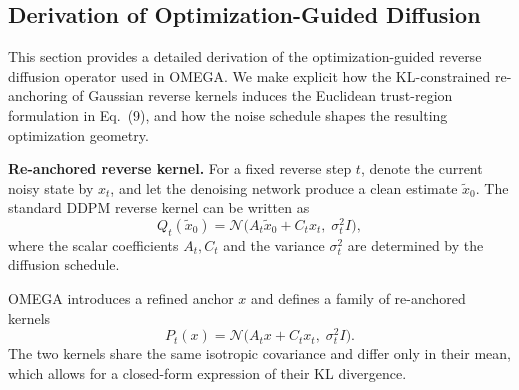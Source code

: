 \documentclass[10pt,twocolumn,letterpaper]{article}
\theoremstyle{plain}
\theoremstyle{remark}
\renewcommand{\paragraph}[1]{\vspace{.5em}\noindent\textbf{#1.}}
\begin{document}
\subsection{Derivation of Optimization-Guided Diffusion}
\label{app:omega_derivation}

This section provides a detailed derivation of the
optimization-guided reverse diffusion operator used in
OMEGA.  
We make explicit how the KL-constrained re-anchoring
of Gaussian reverse kernels induces the Euclidean
trust-region formulation in Eq.~(9), and how the noise
schedule shapes the resulting optimization geometry.

\vspace{3pt}
\paragraph{Re-anchored reverse kernel}
For a fixed reverse step \(t\), denote the current noisy
state by \(x_t\), and let the denoising network produce
a clean estimate \(\tilde{x}_0\).
The standard DDPM reverse kernel can be written as
\begin{equation}
Q_t(\tilde{x}_0)
=
\mathcal{N}\!\bigl(
A_t \tilde{x}_0 + C_t x_t,\;
\sigma_t^2 I
\bigr),
\label{eq:q_kernel_app}
\end{equation}
where the scalar coefficients \(A_t, C_t\) and the variance
\(\sigma_t^2\) are determined by the diffusion schedule.

OMEGA introduces a refined anchor \(x\) and defines a
family of re-anchored kernels
\begin{equation}
P_t(x)
=
\mathcal{N}\!\bigl(
A_t x + C_t x_t,\;
\sigma_t^2 I
\bigr).
\label{eq:p_kernel_app}
\end{equation}
The two kernels share the same isotropic covariance and
differ only in their mean, which allows for a closed-form
expression of their KL divergence.

\vspace{3pt}
\end{document}
